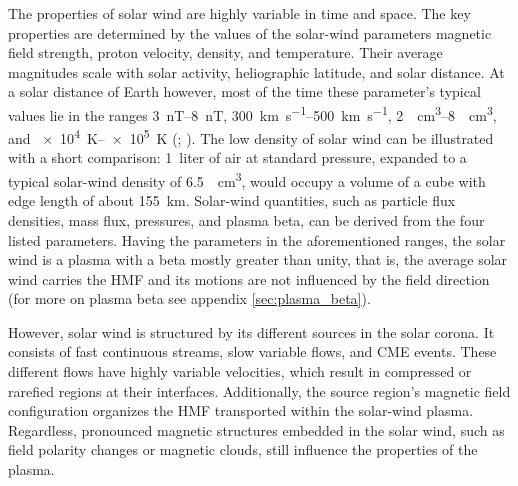 The properties of solar wind are highly variable in time and space. The key properties are determined by the values of the solar-wind parameters magnetic field strength, proton velocity, density, and temperature. Their average magnitudes scale with solar activity, heliographic latitude, and solar distance. At a solar distance of Earth however, most of the time these parameter's typical values lie in the ranges \SIrange{3}{8}{\nano\tesla}, \SIrange{300}{500}{\km\per\s}, \SIrange{2}{8}{\per\cm\cubed}, and \SIrange{e4}{e5}{\K} (\citealp[p.~92]{Kivelson1995}; \citealt{Venzmer2017}). The low density of solar wind can be illustrated with a short comparison: 1~liter of air at standard pressure, expanded to a typical solar-wind density of \SI{6.5}{\per\cm\cubed}, would occupy a volume of a cube with edge length of about \SI{155}{\km}.
Solar-wind quantities, such as particle flux densities, mass flux, pressures, and plasma beta, can be derived from the four listed parameters. Having the parameters in the aforementioned ranges, the solar wind is a plasma with a beta mostly greater than unity, that is, the average solar wind carries the HMF and its motions are not influenced by the field direction (for more on plasma beta see appendix \ref{sec:plasma_beta}).

However, solar wind is structured by its different sources in the solar corona. It consists of fast continuous streams, slow variable flows, and CME events. These different flows have highly variable velocities, which result in compressed or rarefied regions at their interfaces. Additionally, the source region's magnetic field configuration organizes the HMF transported within the solar-wind plasma. Regardless, pronounced magnetic structures embedded in the solar wind, such as field polarity changes or magnetic clouds, still influence the properties of the plasma.\\

